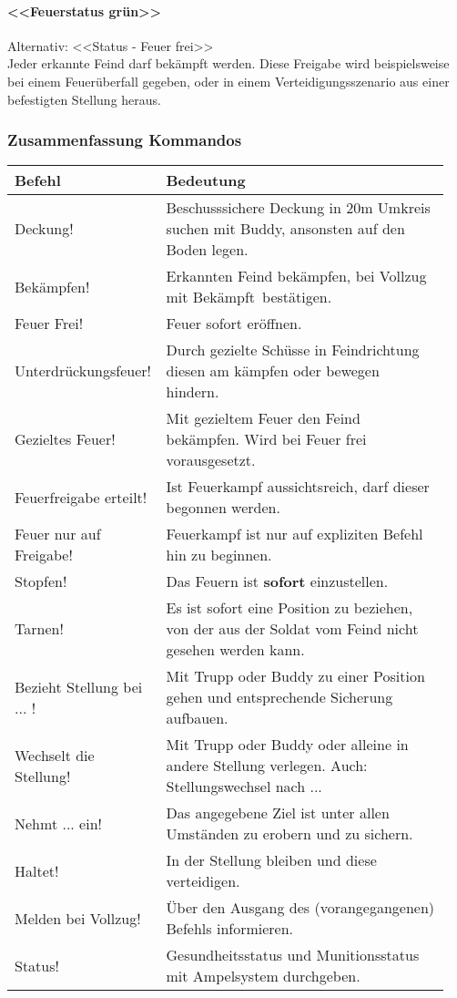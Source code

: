 \paragraph*{<<Feuerstatus grün>>}
	Alternativ: <<Status - Feuer frei>>\hfil\\
	Jeder erkannte Feind darf bekämpft werden. Diese Freigabe wird beispielsweise bei einem Feuerüberfall gegeben, oder in einem Verteidigungsszenario aus einer befestigten Stellung heraus.
	
\subsubsection{Zusammenfassung Kommandos}
\begin{tabular}{|p{0.3\linewidth}|p{0.65\linewidth}|} \hline
	\textbf{Befehl} & \textbf{Bedeutung} \\ \hline
	Deckung! & Beschusssichere Deckung in 20m Umkreis suchen mit Buddy, ansonsten auf den Boden legen.\\ \hline
	Bekämpfen! & Erkannten Feind bekämpfen, bei Vollzug mit \glqq Bekämpft\grqq\, bestätigen.\\ \hline
	Feuer Frei! & Feuer sofort eröffnen.\\ \hline
	Unterdrückungsfeuer! & Durch gezielte Schüsse in Feindrichtung diesen am kämpfen oder bewegen hindern.\\ \hline
	Gezieltes Feuer! & Mit gezieltem Feuer den Feind bekämpfen. Wird bei \glqq Feuer frei\grqq\, vorausgesetzt.\\ \hline
	Feuerfreigabe erteilt! & Ist Feuerkampf aussichtsreich, darf dieser begonnen werden.\\ \hline
	Feuer nur auf Freigabe! & Feuerkampf ist nur auf expliziten Befehl hin zu beginnen.\\ \hline
	Stopfen! & Das Feuern ist \textbf{sofort} einzustellen.\\ \hline
	Tarnen! & Es ist sofort eine Position zu beziehen, von der aus der Soldat vom Feind nicht gesehen werden kann.\\ \hline
	Bezieht Stellung bei ... ! & Mit Trupp oder Buddy zu einer Position gehen und entsprechende Sicherung aufbauen.\\ \hline
	Wechselt die Stellung! & Mit Trupp oder Buddy oder alleine in andere Stellung verlegen. Auch: \glqq Stellungswechsel nach ...\grqq\\ \hline
	Nehmt ... ein! & Das angegebene Ziel ist unter allen Umständen zu erobern und zu sichern.\\ \hline
	Haltet! & In der Stellung bleiben und diese verteidigen.\\ \hline
	Melden bei Vollzug! & Über den Ausgang des (vorangegangenen) Befehls informieren. \\ \hline
	Status! & Gesundheitsstatus und Munitionsstatus mit Ampelsystem durchgeben.\\ \hline
\end{tabular}
